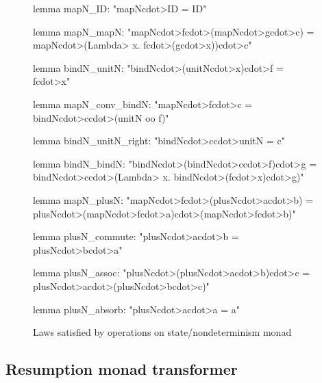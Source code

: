 \begin{figure}
\begin{isacode}
lemma mapN_ID:
  "mapN\<cdot>ID = ID"
\end{isacode}
\unmedskip
{}
\begin{isacode}
lemma mapN_mapN:
  "mapN\<cdot>f\<cdot>(mapN\<cdot>g\<cdot>c) = mapN\<cdot>(\<Lambda> x. f\<cdot>(g\<cdot>x))\<cdot>c"
\end{isacode}
\unmedskip
{}
\begin{isacode}
lemma bindN_unitN:
  "bindN\<cdot>(unitN\<cdot>x)\<cdot>f = f\<cdot>x"
\end{isacode}
\unmedskip
{}
\begin{isacode}
lemma mapN_conv_bindN:
  "mapN\<cdot>f\<cdot>c = bindN\<cdot>c\<cdot>(unitN oo f)"
\end{isacode}
\unmedskip
{}
\begin{isacode}
lemma bindN_unitN_right:
  "bindN\<cdot>c\<cdot>unitN = c"
\end{isacode}
\unmedskip
{}
\begin{isacode}
lemma bindN_bindN:
  "bindN\<cdot>(bindN\<cdot>c\<cdot>f)\<cdot>g = bindN\<cdot>c\<cdot>(\<Lambda> x. bindN\<cdot>(f\<cdot>x)\<cdot>g)"
\end{isacode}
\unmedskip
{}
\begin{isacode}
lemma mapN_plusN:
  "mapN\<cdot>f\<cdot>(plusN\<cdot>a\<cdot>b) = plusN\<cdot>(mapN\<cdot>f\<cdot>a)\<cdot>(mapN\<cdot>f\<cdot>b)"
\end{isacode}
\unmedskip
{}
\begin{isacode}
lemma plusN_commute:
  "plusN\<cdot>a\<cdot>b = plusN\<cdot>b\<cdot>a"
\end{isacode}
\unmedskip
{}
\begin{isacode}
lemma plusN_assoc:
  "plusN\<cdot>(plusN\<cdot>a\<cdot>b)\<cdot>c = plusN\<cdot>a\<cdot>(plusN\<cdot>b\<cdot>c)"
\end{isacode}
\unmedskip
{}
\begin{isacode}
lemma plusN_absorb:
  "plusN\<cdot>a\<cdot>a = a"
\end{isacode}
\caption{Laws satisfied by operations on state/nondeterminism monad}
\label{fig:N-functor-monad}
\end{figure}

\subsection{Resumption monad transformer}
\label{sec:case-resumption-transformer}

